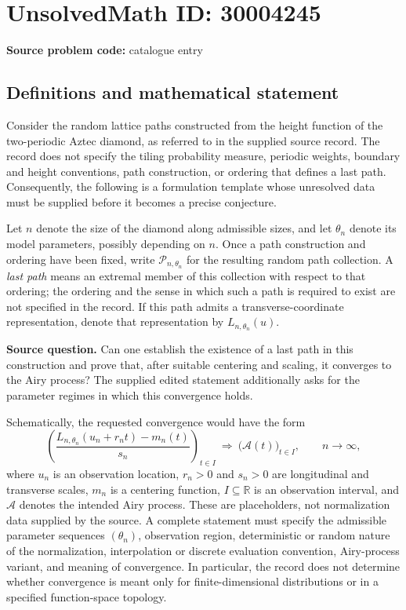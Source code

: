 \documentclass[11pt]{article}
\newcommand{\R}{\mathbb{R}}
\begin{document}
\section*{UnsolvedMath ID: 30004245}
\textbf{Source problem code:} catalogue entry
\subsection{Definitions and mathematical statement}
Consider the random lattice paths constructed from the height function of the two-periodic Aztec diamond, as referred to in the supplied source record. The record does not specify the tiling probability measure, periodic weights, boundary and height conventions, path construction, or ordering that defines a last path. Consequently, the following is a formulation template whose unresolved data must be supplied before it becomes a precise conjecture.

Let \(n\) denote the size of the diamond along admissible sizes, and let \(\theta_n\) denote its model parameters, possibly depending on \(n\). Once a path construction and ordering have been fixed, write \(\mathcal P_{n,\theta_n}\) for the resulting random path collection. A \emph{last path} means an extremal member of this collection with respect to that ordering; the ordering and the sense in which such a path is required to exist are not specified in the record. If this path admits a transverse-coordinate representation, denote that representation by \(L_{n,\theta_n}(u)\).

\textbf{Source question.} Can one establish the existence of a last path in this construction and prove that, after suitable centering and scaling, it converges to the Airy process? The supplied edited statement additionally asks for the parameter regimes in which this convergence holds.

Schematically, the requested convergence would have the form
\[
\left(
\frac{L_{n,\theta_n}(u_n+r_n t)-m_n(t)}{s_n}
\right)_{t\in I}
\ \Longrightarrow\
\bigl(\mathcal A(t)\bigr)_{t\in I},
\qquad n\to\infty,
\]
where \(u_n\) is an observation location, \(r_n>0\) and \(s_n>0\) are longitudinal and transverse scales, \(m_n\) is a centering function, \(I\subseteq\R\) is an observation interval, and \(\mathcal A\) denotes the intended Airy process. These are placeholders, not normalization data supplied by the source. A complete statement must specify the admissible parameter sequences \((\theta_n)\), observation region, deterministic or random nature of the normalization, interpolation or discrete evaluation convention, Airy-process variant, and meaning of convergence. In particular, the record does not determine whether convergence is meant only for finite-dimensional distributions or in a specified function-space topology.
\end{document}
